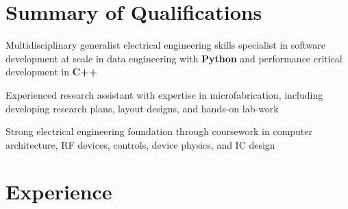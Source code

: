 \documentclass[]{chandan-cv}
\begin{document}
\begin{minipage}[t]{0.78\textwidth}


\section{Summary of Qualifications}
\runsubsection{ }
\descript{ }
\location{ }
\vspace{\topsep} %
\begin{tightemize}
	\item Multidisciplinary generalist electrical engineering skills specialist in software development at scale in data engineering with \textbf{Python} and performance critical development in \textbf{C++}
	\item Experienced research assistant with expertise in  microfabrication, including developing research plans, layout designs, and hands-on lab-work
	\item Strong electrical engineering foundation through coursework in computer architecture, RF devices, controls, device physics, and IC design
\end{tightemize}
\sectionsep


\section{Experience}


\end{minipage}
\end{document}
